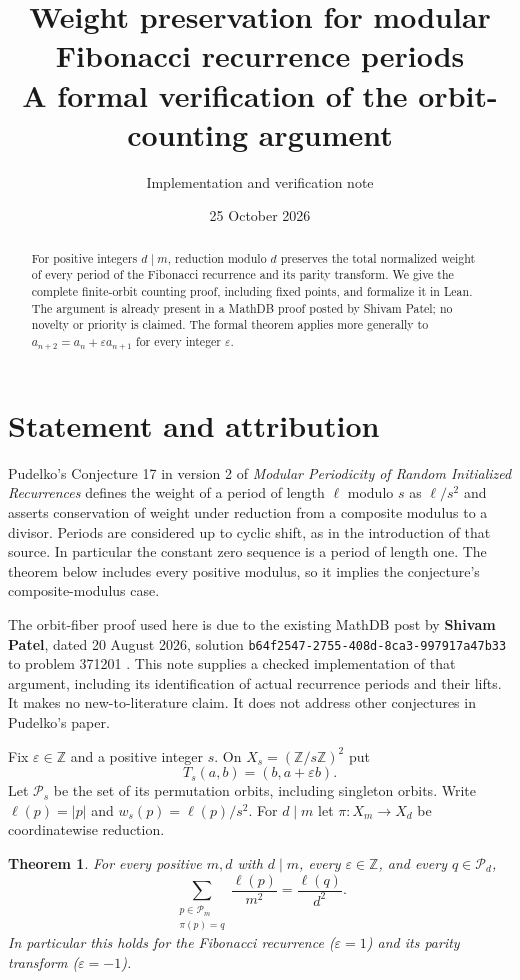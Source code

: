 \documentclass[11pt]{article}
\title{Weight preservation for modular Fibonacci recurrence periods\\
\large A formal verification of the orbit-counting argument}
\author{Implementation and verification note}
\date{25 October 2026}
\newtheorem{theorem}{Theorem}
\newcommand{\Z}{\mathbb Z}
\begin{document}
\maketitle
\begin{abstract}
For positive integers $d\mid m$, reduction modulo $d$ preserves the total normalized
weight of every period of the Fibonacci recurrence and its parity transform.
We give the complete finite-orbit counting proof, including fixed points, and
formalize it in Lean. The argument is already present in a MathDB proof posted by
Shivam Patel; no novelty or priority is claimed. The formal theorem applies more
generally to $a_{n+2}=a_n+\varepsilon a_{n+1}$ for every integer $\varepsilon$.
\end{abstract}

\section{Statement and attribution}
Pudelko's Conjecture 17 in version 2 of \emph{Modular Periodicity of Random
Initialized Recurrences} \cite{pudelko} defines the weight of a period of length
$\ell$ modulo $s$ as $\ell/s^2$ and asserts conservation of weight under reduction
from a composite modulus to a divisor. Periods are considered up to cyclic shift,
as in the introduction of that source. In particular the constant zero sequence
is a period of length one. The theorem below includes every positive modulus,
so it implies the conjecture's composite-modulus case.

The orbit-fiber proof used here is due to the existing MathDB post by
\textbf{Shivam Patel}, dated 20 August 2026, solution
\texttt{b64f2547-2755-408d-8ca3-997917a47b33} to problem 371201 \cite{patel}.
This note supplies a checked implementation of that argument, including its
identification of actual recurrence periods and their lifts. It makes no
new-to-literature claim. It does not address other conjectures in Pudelko's paper.

Fix $\varepsilon\in\Z$ and a positive integer $s$. On
$X_s=(\Z/s\Z)^2$ put
\[
T_s(a,b)=(b,a+\varepsilon b).
\]
Let $\mathcal P_s$ be the set of its permutation orbits, including singleton
orbits. Write $\ell(p)=|p|$ and $w_s(p)=\ell(p)/s^2$. For $d\mid m$ let
$\pi:X_m\to X_d$ be coordinatewise reduction.

\begin{theorem}\label{thm:main}
For every positive $m,d$ with $d\mid m$, every $\varepsilon\in\Z$, and every
$q\in\mathcal P_d$,
\[
 \sum_{\substack{p\in\mathcal P_m\\\pi(p)=q}}
       \frac{\ell(p)}{m^2}
   =\frac{\ell(q)}{d^2}.
\]
In particular this holds for the Fibonacci recurrence ($\varepsilon=1$) and
its parity transform ($\varepsilon=-1$).
\end{theorem}
\end{document}
